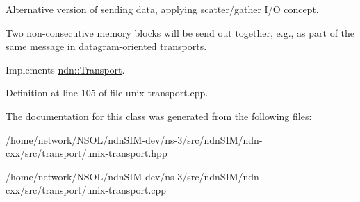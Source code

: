 Alternative version of sending data, applying scatter/gather I/O concept. 

Two non-\/consecutive memory blocks will be send out together, e.\+g., as part of the same message in datagram-\/oriented transports. 

Implements \hyperlink{classndn_1_1Transport_aa27593978570e95a5793b2af0dac3568}{ndn\+::\+Transport}.



Definition at line 105 of file unix-\/transport.\+cpp.



The documentation for this class was generated from the following files\+:\begin{DoxyCompactItemize}
\item 
/home/network/\+N\+S\+O\+L/ndn\+S\+I\+M-\/dev/ns-\/3/src/ndn\+S\+I\+M/ndn-\/cxx/src/transport/unix-\/transport.\+hpp\item 
/home/network/\+N\+S\+O\+L/ndn\+S\+I\+M-\/dev/ns-\/3/src/ndn\+S\+I\+M/ndn-\/cxx/src/transport/unix-\/transport.\+cpp\end{DoxyCompactItemize}
